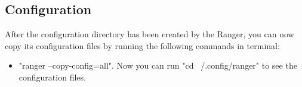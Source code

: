 \subsection{Configuration}
After the configuration directory has been created by the Ranger, you can now copy its configuration files by running the following commands in terminal:
\begin{itemize}
    \item "ranger --copy-config=all". Now you can run "cd ~/.config/ranger" to see the
        configuration files.
\end{itemize}
